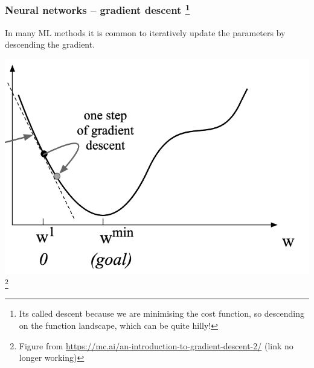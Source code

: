 \documentclass[10pt]{beamer}
\begin{document}
\begin{frame}[fragile]
\frametitle{Neural networks -- gradient descent \footnote{\tiny Its called descent because we are minimising the cost function, so descending on the function landscape, which can be quite hilly!}}

\small In many ML methods it is common to iteratively update the parameters by descending the gradient. \vspace{10pt}\\

\centerline{\includegraphics[scale=0.25]{figures/gradient_descent.png}\footnote{\tiny
    Figure from
    \url{https://mc.ai/an-introduction-to-gradient-descent-2/} (link
    no longer working)}}


\end{frame}
\end{document}

